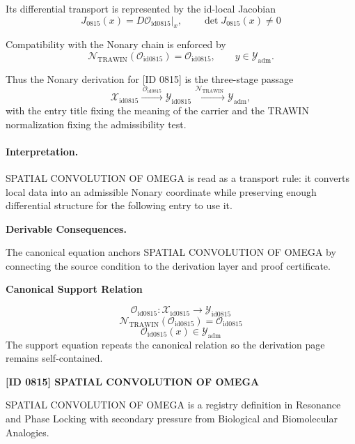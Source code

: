 Its differential transport is represented by the id-local Jacobian\[
J_{0815}(x)=D\mathcal{O}_{\mathrm{id0815}}\big|_x,\qquad \det J_{0815}(x)\neq 0
\]

Compatibility with the Nonary chain is enforced by\[
\mathcal{N}_{\mathrm{TRAWIN}}(\mathcal{O}_{\mathrm{id0815}})=\mathcal{O}_{\mathrm{id0815}},\qquad y\in\mathcal{Y}_{\mathrm{adm}}.
\]

Thus the Nonary derivation for [ID 0815] is the three-stage passage
\[
\mathcal{X}_{\mathrm{id0815}}\xrightarrow{\,\mathcal{O}_{\mathrm{id0815}}\,} \mathcal{Y}_{\mathrm{id0815}}\xrightarrow{\,\mathcal{N}_{\mathrm{TRAWIN}}\,} \mathcal{Y}_{\mathrm{adm}},
\]
with the entry title fixing the meaning of the carrier and the TRAWIN normalization fixing the admissibility test.

\paragraph{Interpretation.} SPATIAL CONVOLUTION OF OMEGA is read as a transport rule: it converts local data into an admissible Nonary coordinate while preserving enough differential structure for the following entry to use it.

\par\vspace{0.35em}
\noindent\textbf{Derivable Consequences.}\quad
\begingroup
\footnotesize
\raggedright
The canonical equation anchors SPATIAL CONVOLUTION OF OMEGA by connecting the source condition to the derivation layer and proof certificate.
\par\endgroup

\noindent\textbf{Canonical Support Relation}\par
\[
\mathcal{O}_{\mathrm{id0815}}:\mathcal{X}_{\mathrm{id0815}}\longrightarrow\mathcal{Y}_{\mathrm{id0815}}
\]
\[
\mathcal{N}_{\mathrm{TRAWIN}}(\mathcal{O}_{\mathrm{id0815}})=\mathcal{O}_{\mathrm{id0815}}
\]
\[
\mathcal{O}_{\mathrm{id0815}}(x)\in\mathcal{Y}_{\mathrm{adm}}
\]
\noindent The support equation repeats the canonical relation so the derivation page remains self-contained.\par

\clearpage
\noindent\textbf{[ID 0815] SPATIAL CONVOLUTION OF OMEGA}\par
\vspace{0.35em}
\begingroup\small
{}
SPATIAL CONVOLUTION OF OMEGA is a registry definition in Resonance and Phase Locking with secondary pressure from Biological and Biomolecular Analogies.

